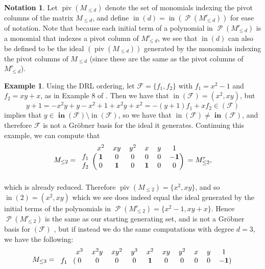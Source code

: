 \documentclass[11pt]{article}
\newcommand{\F}{\mathcal{F}}
\DeclareMathOperator{\Poly}{\mathscr{P}}
\DeclareMathOperator{\init}{in}
\DeclareMathOperator{\Init}{\mathbf{in}}
\DeclareMathOperator{\piv}{piv}
\theoremstyle{definition}
\newtheorem{example}{Example}
\newtheorem*{notation}{Notation}
\begin{document}
\begin{notation}
	Let $\piv(M_{\leq d})$ denote the set of monomials indexing the pivot columns of the matrix $M_{\leq d}$, and define $\init(d) = \init(\Poly(M_{\leq d}^r))$ for ease of notation. Note that because each initial term of a polynomial in $\Poly(M_{\leq d}^r)$ is a monomial that indexes a pivot column of $M_{\leq d}^r$, we see that $\init(d)$ can also be defined to be the ideal $(\piv(M_{\leq d}))$ generated by the monomials indexing the pivot columns of $M_{\leq d}$ (since these are the same as the pivot columns of $M_{\leq d}^r$). 
\end{notation}


\begin{example}
	Using the DRL ordering, let $\F = \{f_1, f_2\}$ with $f_1 = x^2 - 1$ and $f_2 = xy + x$, as in Example 8 of \cite{caminata2020solving}. Then we have that $\init(\F) = (x^2, xy)$, but \[ y + 1 = -x^2y + y - x^2 + 1 + x^2y + x^2 = -(y + 1) f_1 + x f_2 \in (\F) \] implies that $y \in \Init(\F) \setminus \init(\F)$, so we have that $\init(\F) \neq \Init(\F)$, and therefore $\F$ is not a Gröbner basis for the ideal it generates. Continuing this example, we can compute that \[ M_{\leq 2} = \begin{blockarray}{ccccccc}
	    & x^2 & xy & y^2 & x & y & 1 \\
	    \begin{block}{c(cccccc)}
	        f_1 & \mathbf{1} & 0 & 0 & 0 & 0 & \mathbf{-1} \\
	        f_2 & 0 & \mathbf{1} & 0 & \mathbf{1} & 0 & 0 \\
	    \end{block}
	\end{blockarray} \,\, = M_{\leq 2}^r, \] which is already reduced. Therefore $\piv(M_{\leq 2}) = \{x^2, xy\}$, and so $\init(2) = (x^2, xy)$ which we see does indeed equal the ideal generated by the initial terms of the polynomials in $\Poly(M_{\leq 2}^r) = \{x^2 - 1, xy + x\}$. Hence $\Poly(M_{\leq 2}^r)$ is the same as our starting generating set, and is not a Gröbner basis for $(\F)$ , but if instead we do the same computations with degree $d = 3$, we have the following: \[ M_{\leq 3} = \begin{blockarray}{ccccccccccc}
	    & x^3 & x^2y & xy^2 & y^3 & x^2 & xy & y^2 & x & y & 1 \\
	    \begin{block}{c(cccccccccc)}
	        f_1 & 0 & 0 & 0 & 0 & \mathbf{1} & 0 & 0 & 0 & 0 & \mathbf{-1} \\

\end{block}
\end{blockarray}\]
\end{example}
\end{document}
